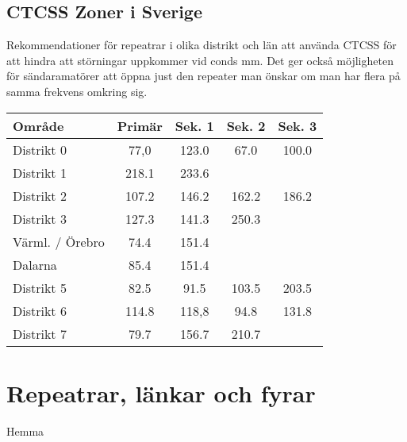 \documentclass[10pt,swedish,a4paper,twoside]{article}
\begin{document}
\subsection{CTCSS Zoner i Sverige}

Rekommendationer för repeatrar i olika distrikt och län att använda CTCSS för att hindra att störningar uppkommer vid conds mm. Det ger också möjligheten för sändaramatörer att öppna just den repeater man önskar om man har flera på samma frekvens omkring sig.

\begin{longtable}{lcccc}
	\textbf{Område} & \textbf{Primär} & \textbf{Sek. 1} & \textbf{Sek. 2} & \textbf{Sek. 3} \\ \hline
	Distrikt 0      &      77,0       &      123.0      &      67.0       &      100.0      \\
	Distrikt 1      &      218.1      &      233.6      &                 &  \\
	Distrikt 2      &      107.2      &      146.2      &      162.2      &      186.2      \\
	Distrikt 3      &      127.3      &      141.3      &      250.3      &  \\
	Värml. / Örebro &      74.4       &      151.4      &                 &  \\
	Dalarna         &      85.4       &      151.4      &                 &  \\
	Distrikt 5      &      82.5       &      91.5       &      103.5      &      203.5      \\
	Distrikt 6      &      114.8      &      118,8      &      94.8       &      131.8      \\
	Distrikt 7      &      79.7       &      156.7      &      210.7      &
\end{longtable}

\section{Repeatrar, länkar och fyrar}

Hemma
\end{document}
